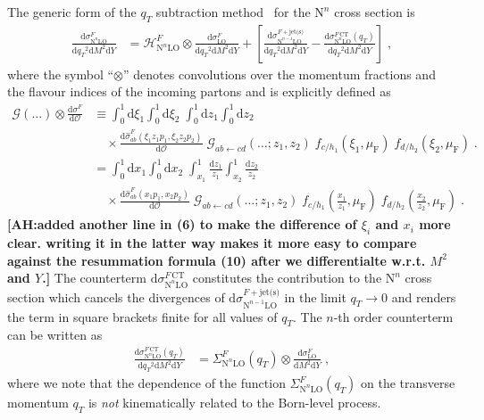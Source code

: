\documentclass[12pt]{article}
\DeclareRobustCommand{\nn}{\nonumber}
\DeclareRobustCommand{\AH}[1]{\textbf{\quad\color{purple}[AH:\quad #1]}\xspace}
\DeclareRobustCommand{\muf}{\ensuremath{\mu_{\mathrm{F}}}\xspace}
\DeclareRobustCommand{\qt}{\ensuremath{q_T}\xspace}
\DeclareRobustCommand{\rd}{\ensuremath{\mathrm{d}}}
\DeclareRobustCommand{\cO}{\ensuremath{\mathcal{O}}}
\DeclareRobustCommand{\cG}{\ensuremath{\mathcal{G}}}
\DeclareRobustCommand{\cH}{\ensuremath{\mathcal{H}}}
\DeclareRobustCommand{\obs}{\cO\xspace}
\DeclareRobustCommand{\jets}{\text{jet(s)}\xspace}
\DeclareRobustCommand{\CT}{\text{CT}\xspace}
\DeclareRobustCommand{\LO}{\text{LO}\xspace}
\DeclareRobustCommand{\N}[1]{\ensuremath{\text{N}^{#1}}} %
\begin{document}
The generic form of the $\qt$ subtraction method~\cite{Catani:2007vq} for the \N{n}\LO cross section is
\begin{align}
  \frac{\rd\sigma^{F}_{\N{n}\LO}}{\rd\qt^2\rd M^2\rd Y}
  &=
  \cH^F_{\N{n}\LO} \otimes
  \frac{\rd\sigma^{F}_{\LO}}{\rd\qt^2\rd M^2\rd Y} +
  \left[ 
    \frac{\rd\sigma^{F+\jets}_{\N{n-1}\LO}}{\rd\qt^2\rd M^2\rd Y} -
    \frac{\rd\sigma^{F\,\CT}_{\N{n}\LO}(\qt)}{\rd\qt^2\rd M^2\rd Y}
  \right] \;,
  \label{eq:master}
\end{align}
where the symbol ``$\otimes$'' denotes convolutions over the momentum fractions and the flavour indices of the incoming partons and is explicitly defined as
\begin{align}
  \cG(\dots) \otimes \frac{\rd\sigma^{F}}{\rd\obs} 
  &\equiv
  \int_0^1\rd\xi_1 \int_0^1\rd\xi_2 \;
  \int_0^1\rd z_1  \int_0^1 \rd z_2 \; 
  \nonumber\\&\quad
  \times 
  \frac{\rd\hat{\sigma}^{F}_{ab}(\xi_1 z_1 p_1, \xi_2 z_2 p_2)}{\rd\obs} \;
  \cG_{ab \gets cd}(\ldots; z_1, z_2) \;
  f_{c/h_1}(\xi_1,\muf) \; f_{d/h_2}(\xi_2,\muf) \;.
  \nn\\&=
  \int_0^1\rd x_1 \int_0^1\rd x_2 \;
  \int_{x_1}^1 \frac{\rd z_1}{z_1} \int_{x_2}^1 \frac{\rd z_2}{z_2} \; 
  \nonumber\\&\quad
  \times 
  \frac{\rd\hat{\sigma}^{F}_{ab}(x_1 p_1, x_2 p_2)}{\rd\obs} \;
  \cG_{ab \gets cd}(\ldots; z_1, z_2) \;
  f_{c/h_1}\left(\frac{x_1}{z_1},\muf\right) \; f_{d/h_2}\left(\frac{x_2}{z_2},\muf\right) \;.
\end{align}
\AH{added another line in (6) to make the difference of $\xi_i$ and $x_i$ more clear. writing it in the latter way makes it more easy to compare against the resummation formula (10) after we differentialte w.r.t. $M^2$ and $Y$.}
The counterterm $\rd\sigma^{F\,\CT}_{\N{n}\LO}$ constitutes the contribution to the \N{n}\LO cross section which cancels the divergences of $\rd\sigma^{F+\jets}_{\N{n-1}\LO}$ in the limit $\qt \rightarrow 0$ and renders the term in square brackets finite for all values of $\qt$. 
The $n$-th order counterterm can be written as
\begin{align}
  \frac{\rd\sigma^{F\,\CT}_{\N{n}\LO}(\qt)}{\rd\qt^2\rd M^2\rd Y}
  &=
  \Sigma^F_{\N{n}\LO}(\qt) \otimes
  \frac{\rd\sigma^{F}_{\LO}}{\rd M^2\rd Y} \;,
  \label{eq:CT}
\end{align}
where we note that the dependence of the function $\Sigma^{F}_{\N{n}\LO}(\qt)$ on the transverse momentum $\qt$ is \emph{not} kinematically related to the Born-level process.
\end{document}
